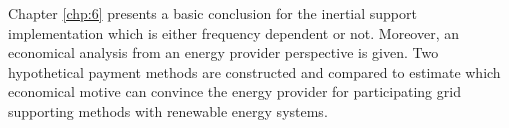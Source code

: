 Chapter \ref{chp:6} presents a basic conclusion for the inertial support implementation which is either frequency dependent or not. Moreover, an economical analysis from an energy provider perspective is given. Two hypothetical payment methods are constructed and compared to estimate which economical motive can convince the energy provider for participating grid supporting methods with renewable energy systems.  


















